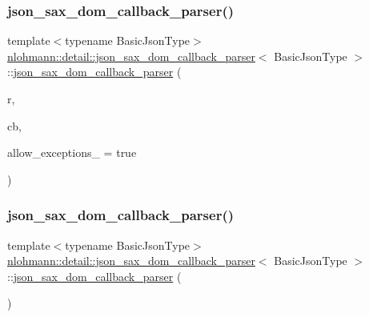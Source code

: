 \subsubsection{\texorpdfstring{json\_sax\_dom\_callback\_parser()}{json\_sax\_dom\_callback\_parser()}\hspace{0.1cm}{\footnotesize\ttfamily [1/3]}}
{\footnotesize\ttfamily template$<$typename Basic\+Json\+Type$>$ \\
\mbox{\hyperlink{classnlohmann_1_1detail_1_1json__sax__dom__callback__parser}{nlohmann\+::detail\+::json\+\_\+sax\+\_\+dom\+\_\+callback\+\_\+parser}}$<$ Basic\+Json\+Type $>$\+::\mbox{\hyperlink{classnlohmann_1_1detail_1_1json__sax__dom__callback__parser}{json\+\_\+sax\+\_\+dom\+\_\+callback\+\_\+parser}} (\begin{DoxyParamCaption}\item[{Basic\+Json\+Type \&}]{r,  }\item[{const \mbox{\hyperlink{classnlohmann_1_1detail_1_1json__sax__dom__callback__parser_a4f636086fa8e7cf26c35c8afd50903ce}{parser\+\_\+callback\+\_\+t}}}]{cb,  }\item[{const bool}]{allow\+\_\+exceptions\+\_\+ = {\ttfamily true} }\end{DoxyParamCaption})\hspace{0.3cm}{\ttfamily [inline]}}

\mbox{\label{classnlohmann_1_1detail_1_1json__sax__dom__callback__parser_a589998730e650a425b1b311e2e9f7f09}} 
\subsubsection{\texorpdfstring{json\_sax\_dom\_callback\_parser()}{json\_sax\_dom\_callback\_parser()}\hspace{0.1cm}{\footnotesize\ttfamily [2/3]}}
{\footnotesize\ttfamily template$<$typename Basic\+Json\+Type$>$ \\
\mbox{\hyperlink{classnlohmann_1_1detail_1_1json__sax__dom__callback__parser}{nlohmann\+::detail\+::json\+\_\+sax\+\_\+dom\+\_\+callback\+\_\+parser}}$<$ Basic\+Json\+Type $>$\+::\mbox{\hyperlink{classnlohmann_1_1detail_1_1json__sax__dom__callback__parser}{json\+\_\+sax\+\_\+dom\+\_\+callback\+\_\+parser}} (\begin{DoxyParamCaption}\item[{const \mbox{\hyperlink{classnlohmann_1_1detail_1_1json__sax__dom__callback__parser}{json\+\_\+sax\+\_\+dom\+\_\+callback\+\_\+parser}}$<$ Basic\+Json\+Type $>$ \&}]{ }\end{DoxyParamCaption})\hspace{0.3cm}{\ttfamily [delete]}}

